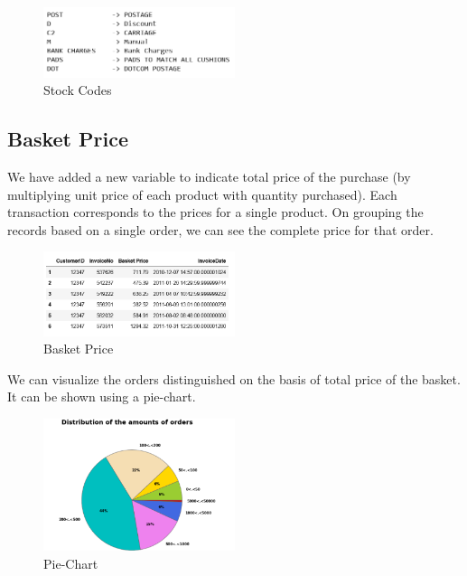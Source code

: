 \begin{figure}[H]
\caption{Stock Codes}
\label{2.4}
\centering
\includegraphics[width=0.5\textwidth]{images/2_4.PNG}
\end{figure}

\subsection{Basket Price}

We have added a new variable to indicate total price of the purchase (by multiplying unit price of each product with quantity purchased). Each transaction corresponds to the prices for a single product. On grouping the records based on a single order, we can see the complete price for that order.\\

\begin{figure}[H]
\caption{Basket Price}
\label{2.5}
\centering
\includegraphics[width=0.5\textwidth]{images/2_5.PNG}
\end{figure}

We can visualize the orders distinguished on the basis of total price of the basket. It can be shown using a pie-chart.

\begin{figure}[H]
\caption{Pie-Chart}
\label{2.6}
\centering
\includegraphics[width=0.5\textwidth]{images/2_6.PNG}
\end{figure}

